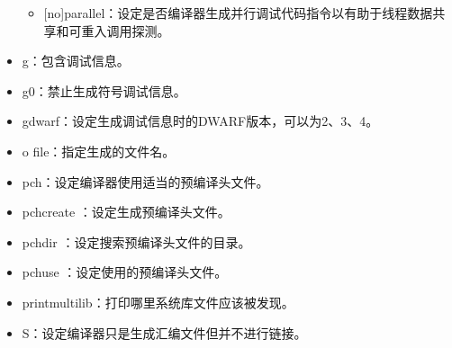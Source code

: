 \documentclass[a4paper,12pt,english]{sphinxmanual}
\begin{document}
\begin{itemize}
\begin{itemize}
\item {} 
\sphinxAtStartPar
{[}no{]}parallel：设定是否编译器生成并行调试代码指令以有助于线程数据共享和可重入调用探测。

\end{itemize}

\item {} 
\sphinxAtStartPar
\sphinxhyphen{}g：包含调试信息。

\item {} 
\sphinxAtStartPar
\sphinxhyphen{}g0：禁止生成符号调试信息。

\item {} 
\sphinxAtStartPar
\sphinxhyphen{}gdwarf\sphinxhyphen{}：设定生成调试信息时的DWARF版本，可以为2、3、4。

\item {} 
\sphinxAtStartPar
\sphinxhyphen{}o file：指定生成的文件名。

\item {} 
\sphinxAtStartPar
\sphinxhyphen{}pch：设定编译器使用适当的预编译头文件。

\item {} 
\sphinxAtStartPar
\sphinxhyphen{}pch\sphinxhyphen{}create ：设定生成预编译头文件。

\item {} 
\sphinxAtStartPar
\sphinxhyphen{}pch\sphinxhyphen{}dir ：设定搜索预编译头文件的目录。

\item {} 
\sphinxAtStartPar
\sphinxhyphen{}pch\sphinxhyphen{}use ：设定使用的预编译头文件。

\item {} 
\sphinxAtStartPar
\sphinxhyphen{}print\sphinxhyphen{}multi\sphinxhyphen{}lib：打印哪里系统库文件应该被发现。

\item {} 
\sphinxAtStartPar
\sphinxhyphen{}S：设定编译器只是生成汇编文件但并不进行链接。

\end{itemize}
\end{document}
